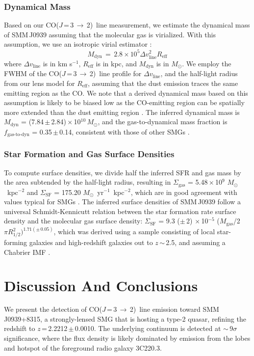 \documentclass[twocolumn,apj,numberedappendix]{emulateapj}
\newcommand{\Msun}{\mbox{$M_{\odot}$}}
\newcommand{\CO}{\mbox{CO($J$\,=\,3\,$\rightarrow$\,2) }}
\newcommand{\eg}{{\sl e.g.,~}}
\newcommand{\pmOne}{\mbox{$^{-1}$}}
\begin{document}
\subsubsection{Dynamical Mass}
Based on our \CO line measurement, we estimate the dynamical mass of SMM\,J0939 assuming that the molecular gas is virialized. With this assumption, we use an isotropic virial estimator \citep[\eg][]{Engel10a}:
\begin{equation}
M_\textrm{dyn}\,=\,2.8\times 10^5\Delta v_\textrm{line}^ 2 R_\textrm{eff}
\end{equation}
where $\Delta v_\textrm{line}$ is in km\,\,s\pmOne, $R_\textrm{eff}$ is in kpc, and $M_\textrm{dyn}$ is in \Msun.
We employ the FWHM of the \CO line profile for $\Delta v_\textrm{line}$,
and the half-light radius from our lens model for $R_\textrm{eff}$, assuming that the dust emission traces the same emitting region as the CO. We note that a derived dynamical mass based on this assumption is likely to be biased low as the CO-emitting region can be spatially more extended than the dust emitting region \citep[\eg][]{Tacconi06a, Riechers11c,Riechers11d,Ivison11a}.
% 
The inferred dynamical mass is $M_\textrm{dyn}$ = (7.84\,$\pm$\,2.84)\,$\times$\,10$^{10}$\,\Msun, and the gas-to-dynamical mass fraction is $f_\textrm{gas-to-dyn}$ = 0.35\,$\pm$\,0.14, consistent with those of other SMGs \citep{Tacconi06a}.

\subsubsection{Star Formation and Gas Surface Densities}
To compute surface densities, we divide half the inferred SFR and gas mass by the area subtended by the half-light
radius, resulting in $\Sigma_\textrm{gas}$ = 5.48\,$\times$\,10$^9$ \Msun~kpc$^{-2}$ and $\Sigma_\textrm{SF}$ = 175.20 \Msun~yr\pmOne~kpc$^{-2}$, which are in good agreement with values typical for SMGs \citep{Tacconi08a}. 
The inferred surface densities of SMM\,J0939 follow a universal Schmidt-Kennicutt relation between the star formation rate
surface density and the molecular gas surface density: $\Sigma_\textrm{SF}$ = 9.3 ($\pm$\,2) $\times$\,10$^{-5}$ ($M_\textrm{gas}$/2$\pi R_\textrm{1/2}^2)^{1.71(\pm\,0.05)}$, which was derived using a sample consisting of local star-forming galaxies and high-redshift
galaxies
out to $z$\,$\sim$\,2.5, and assuming a Chabrier IMF \citep{B07a}.

\section{Discussion And Conclusions}
%
We present the detection of \CO line emission toward SMM\,J0939+8315, a strongly-lensed SMG that is hosting a type-2 quasar, refining the redshift
to $z$\,=\,2.2212\,$\pm$\,0.0010. The underlying continuum is detected at $\sim$\,9$\sigma$ significance, where the flux density is likely dominated by emission from the lobes and hotspot of the foreground radio galaxy 3C220.3.
\end{document}
